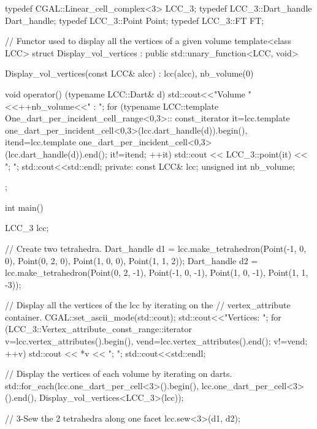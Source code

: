 \begin{ccExampleCode}
typedef CGAL::Linear_cell_complex<3> LCC_3;
typedef LCC_3::Dart_handle           Dart_handle;
typedef LCC_3::Point                 Point;
typedef LCC_3::FT                    FT;

// Functor used to display all the vertices of a given volume
template<class LCC> 
struct Display_vol_vertices : public std::unary_function<LCC, void>
{
  Display_vol_vertices(const LCC& alcc) : 
    lcc(alcc), 
    nb_volume(0)
  {}

  void operator() (typename LCC::Dart& d) 
  { 
    std::cout<<"Volume "<<++nb_volume<<" : ";
    for (typename LCC::template One_dart_per_incident_cell_range<0,3>::
         const_iterator it=lcc.template 
         one_dart_per_incident_cell<0,3>(lcc.dart_handle(d)).begin(),
         itend=lcc.template one_dart_per_incident_cell<0,3>
         (lcc.dart_handle(d)).end(); it!=itend; ++it)
      {
        std::cout << LCC_3::point(it) << "; ";
      }
    std::cout<<std::endl;
  }
private:
  const LCC& lcc;
  unsigned int nb_volume;
};

int main()
{
  LCC_3 lcc;

  // Create two tetrahedra.
  Dart_handle d1 = lcc.make_tetrahedron(Point(-1, 0, 0), 
                                       Point(0, 2, 0), 
                                       Point(1, 0, 0), 
                                       Point(1, 1, 2));
  Dart_handle d2 = lcc.make_tetrahedron(Point(0, 2, -1), 
                                       Point(-1, 0, -1),
                                       Point(1, 0, -1), 
                                       Point(1, 1, -3));

  // Display all the vertices of the lcc by iterating on the 
  // vertex_attribute container.
  CGAL::set_ascii_mode(std::cout);
  std::cout<<"Vertices: ";
  for (LCC_3::Vertex_attribute_const_range::iterator 
       v=lcc.vertex_attributes().begin(), 
       vend=lcc.vertex_attributes().end(); v!=vend; ++v)
    std::cout << *v << "; ";
  std::cout<<std::endl;

  // Display the vertices of each volume by iterating on darts.
  std::for_each(lcc.one_dart_per_cell<3>().begin(),
                lcc.one_dart_per_cell<3>().end(),
                Display_vol_vertices<LCC_3>(lcc));  

  // 3-Sew the 2 tetrahedra along one facet
  lcc.sew<3>(d1, d2);

}
\end{ccExampleCode}
